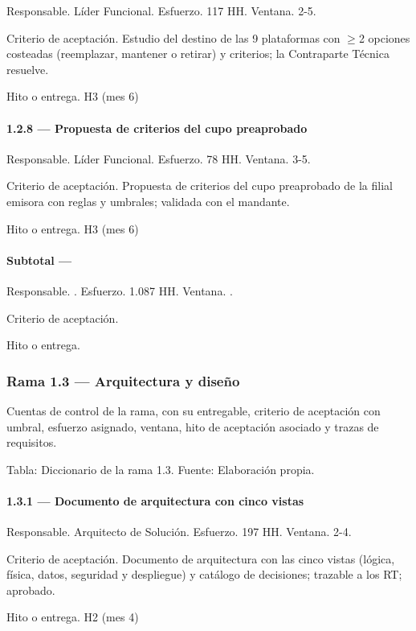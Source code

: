 \documentclass[11pt]{article}
\begin{document}
Responsable. Líder Funcional. Esfuerzo. 117 HH. Ventana. 2-5.

Criterio de aceptación. Estudio del destino de las 9 plataformas con \(\geq\)2 opciones costeadas (reemplazar, mantener o retirar) y criterios; la Contraparte Técnica resuelve.

Hito o entrega. H3 (mes 6)

\paragraph{1.2.8 — Propuesta de criterios del cupo preaprobado}

Responsable. Líder Funcional. Esfuerzo. 78 HH. Ventana. 3-5.

Criterio de aceptación. Propuesta de criterios del cupo preaprobado de la filial emisora con reglas y umbrales; validada con el mandante.

Hito o entrega. H3 (mes 6)

\paragraph{Subtotal — }

Responsable. . Esfuerzo. 1.087 HH. Ventana. .

Criterio de aceptación.

Hito o entrega.

\subsubsection{Rama 1.3 — Arquitectura y diseño}

Cuentas de control de la rama, con su entregable, criterio de aceptación con umbral, esfuerzo asignado, ventana, hito de aceptación asociado y trazas de requisitos.

Tabla: Diccionario de la rama 1.3. Fuente: Elaboración propia.

\paragraph{1.3.1 — Documento de arquitectura con cinco vistas}

Responsable. Arquitecto de Solución. Esfuerzo. 197 HH. Ventana. 2-4.

Criterio de aceptación. Documento de arquitectura con las cinco vistas (lógica, física, datos, seguridad y despliegue) y catálogo de decisiones; trazable a los RT; aprobado.

Hito o entrega. H2 (mes 4)
\end{document}
